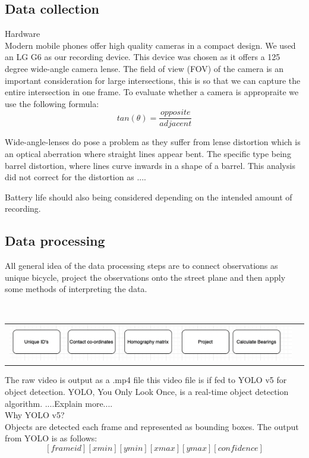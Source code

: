 \documentclass[
10pt, %
a4paper, %
oneside, %
headinclude,footinclude, %
] {book}%
\begin{document}
\subsection{Data collection}
Hardware
\ \\
Modern mobile phones offer high quality cameras in a compact design. We used an LG G6 as our recording device.
This device was chosen as it offers a 125 degree wide-angle camera lense. The field of view (FOV) of the camera is an important consideration
for large intersections, this is so that we can capture the entire intersection in one frame. To evaluate whether a camera is appropraite we use the following formula:
\[ tan(\theta ) = \frac{opposite}{adjacent}\]

Wide-angle-lenses do pose a problem as they suffer from lense distortion which is an optical aberration where straight lines appear bent.
The specific type being barrel distortion, where lines curve inwards in a shape of a barrel. This analysis did not correct for the distortion as ....

Battery life should also being considered depending on the intended amount of recording. 

\subsection{Data processing}

All general idea of the data processing steps are to connect observations as unique bicycle,
project the observations onto the street plane and then apply some methods of interpreting the data.

\ \\ 
\noindent
\begin{tabular}{@{}cc}
\includegraphics[width=1.0\columnwidth]{temp.png} 
\end{tabular}
\label{data_pipeline}

The raw video is output as a .mp4 file this video file is if fed to YOLO v5 for object detection. YOLO, You Only Look Once,
is a real-time object detection algorithm. ....Explain more.... 
\ \\ 
Why YOLO v5?
\ \\ 
Objects are detected each frame and represented as bounding boxes.
The output from YOLO is as follows: \[ [frame id][xmin][ymin][xmax][ymax][confidence]  \]
\end{document}
